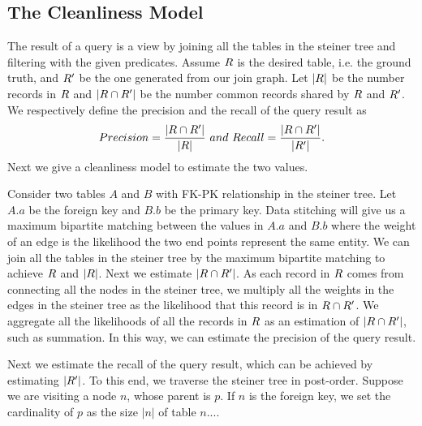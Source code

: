 
\subsection{The Cleanliness Model}\label{subsec:model:recall}

The result of a query is a view by joining all the tables in the steiner tree
and filtering with the given predicates. Assume $R$ is the desired table, i.e.
the ground truth, and $R'$ be the one generated from our join graph. Let
$|R|$ be the number records in $R$ and $|R\cap R'|$ be the number common
records shared by $R$ and $R'$. We respectively define the precision and the
recall of the query result as
$$Precision=\frac{|R\cap R'|}{|R|}~and~Recall=\frac{|R\cap R'|}{|R'|}.$$
Next we give a cleanliness model to estimate the two values.

Consider two tables $A$ and $B$ with FK-PK relationship in the steiner tree. Let
$A.a$ be the foreign key and $B.b$ be the primary key. Data stitching will give
us a maximum bipartite matching between the values in $A.a$ and $B.b$ where the
weight of an edge is the likelihood the two end points represent the same
entity. We can join all the tables in the steiner tree by the maximum bipartite
matching to achieve $R$ and $|R|$. Next we estimate $|R\cap R'|$. As each
record in $R$ comes from connecting all the nodes in the steiner tree, we
multiply all the weights in the edges in the steiner tree as the likelihood that
this record is in $R\cap R'$. We aggregate all the likelihoods of all the
records in $R$ as an estimation of $|R\cap R'|$, such as summation. In this
way, we can estimate the precision of the query result.


Next we estimate the recall of the query result, which can be achieved by
estimating $|R'|$. To this end, we traverse the steiner tree in post-order.
Suppose we are visiting a node $n$, whose parent is $p$. If $n$ is the foreign
key, we set the cardinality of $p$ as the size $|n|$ of table $n$....



